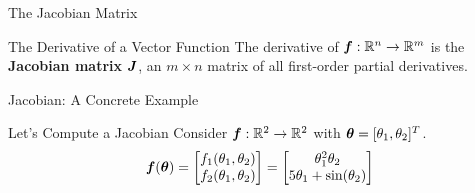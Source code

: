 \documentclass{beamer}
\begin{document}
\begin{frame}{The Jacobian Matrix}
\begin{definitionbox}{The Derivative of a Vector Function}
The derivative of $\bm{f}: \mathbb{R}^n \to \mathbb{R}^m$ is the \textbf{Jacobian matrix} $\bm{J}$, an $m \times n$ matrix of all first-order partial derivatives.
\end{definitionbox}
\end{frame}

\begin{frame}{Jacobian: A Concrete Example}
\begin{examplebox}{Let's Compute a Jacobian}
Consider $\bm{f}: \mathbb{R}^2 \to \mathbb{R}^2$ with $\bm{\theta} = [\theta_1, \theta_2]^T$.
$$
\bm{f}(\bm{\theta}) = \begin{bmatrix}
f_1(\theta_1, \theta_2) \\
f_2(\theta_1, \theta_2)
\end{bmatrix} =
\begin{bmatrix}
\theta_1^2 \theta_2 \\
5\theta_1 + \sin(\theta_2)
\end{bmatrix}
$$
\end{examplebox}
\end{frame}
\end{document}
